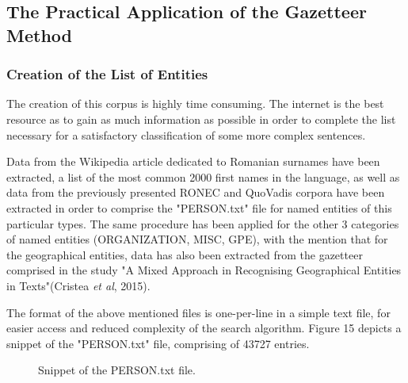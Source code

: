 \documentclass[12pt,a4paper]{article}
\begin{document}
\subsection{The Practical Application of the Gazetteer Method}
\subsubsection{Creation of the List of Entities}

\qquad \quad The creation of this corpus is highly time consuming. The internet is the best resource as to gain as much information as possible in order to complete the list necessary for a satisfactory classification of some more complex sentences.

\qquad Data from the Wikipedia article dedicated to Romanian surnames have been extracted, a list of the most common 2000 first names in the language, as well as data from the previously presented RONEC and QuoVadis corpora have been extracted in order to comprise the "PERSON.txt" file for named entities of this particular types. The same procedure has been applied for the other 3 categories of named entities (ORGANIZATION, MISC, GPE), with the mention that for the geographical entities, data has also been extracted from the gazetteer comprised in the study "A Mixed Approach in Recognising Geographical Entities in Texts"(Cristea \textit{et al}, 2015).

\qquad The format of the above mentioned files is one-per-line in a simple text file, for easier access and reduced complexity of the search algorithm. Figure 15 depicts a snippet of the "PERSON.txt" file, comprising of 43727 entries.

\begin{figure}[h!]
\begin{center}
\end{center}
\caption{Snippet of the PERSON.txt file.}
\end{figure}
\end{document}
